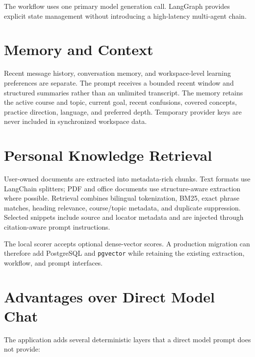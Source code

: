 \documentclass[a4paper,11pt]{article}
\begin{document}
The workflow uses one primary model generation call. LangGraph provides explicit state management without introducing a high-latency multi-agent chain.

\section{Memory and Context}

Recent message history, conversation memory, and workspace-level learning preferences are separate. The prompt receives a bounded recent window and structured summaries rather than an unlimited transcript. The memory retains the active course and topic, current goal, recent confusions, covered concepts, practice direction, language, and preferred depth. Temporary provider keys are never included in synchronized workspace data.

\section{Personal Knowledge Retrieval}

User-owned documents are extracted into metadata-rich chunks. Text formats use LangChain splitters; PDF and office documents use structure-aware extraction where possible. Retrieval combines bilingual tokenization, BM25, exact phrase matches, heading relevance, course/topic metadata, and duplicate suppression. Selected snippets include source and locator metadata and are injected through citation-aware prompt instructions.

The local scorer accepts optional dense-vector scores. A production migration can therefore add PostgreSQL and \texttt{pgvector} while retaining the existing extraction, workflow, and prompt interfaces.

\section{Advantages over Direct Model Chat}

The application adds several deterministic layers that a direct model prompt does not provide:
\end{document}
